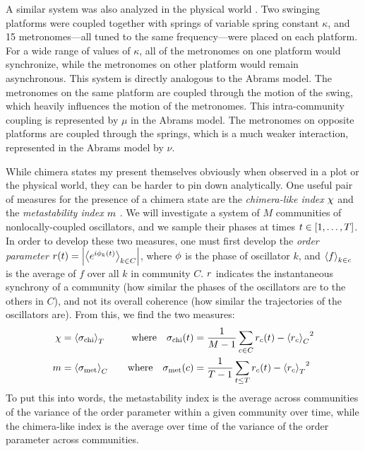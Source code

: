 A similar system was also analyzed in the physical world \cite{Martens2013}.
Two swinging platforms were coupled together with springs of variable spring constant $\kappa$, and 15 metronomes---all tuned to the same frequency---were placed on each platform.
For a wide range of values of $\kappa$, all of the metronomes on one platform would synchronize, while the metronomes on other platform would remain asynchronous.
This system is directly analogous to the Abrams model.
The metronomes on the same platform are coupled through the motion of the swing, which heavily influences the motion of the metronomes.
This intra-community coupling is represented by $\mu$ in the Abrams model.
The metronomes on opposite platforms are coupled through the springs, which is a much weaker interaction, represented in the Abrams model by $\nu$.

While chimera states my present themselves obviously when observed in a plot or the physical world, they can be harder to pin down analytically.
One useful pair of measures for the presence of a chimera state are the \textit{chimera-like index} $\chi$ and the \textit{metastability index} $m$ \cite{Shanahan2010,Hizanidis2016}.
We will investigate a system of $M$ communities of nonlocally-coupled oscillators, and we sample their phases at times $t \in \bqty{1, \ldots, T}$.
In order to develop these two measures, one must first develop the \textit{order parameter} $r(t) = \abs{\expval{e^{i \phi_{k}(t)}}_{k \in C}}$, where $\phi$ is the phase of oscillator $k$, and $\ev{f}_{k \in c}$ is the average of $f$ over all $k$ in community $C$.
$r$ indicates the instantaneous synchrony of a community (how similar the phases of the oscillators are to the others in $C$), and not its overall coherence (how similar the trajectories of the oscillators are).
From this, we find the two measures:
\begin{align}
  \label{eq:chimera}
  \chimera
  &=
    \expval{\sigma_{\text{chi}}}_{T}
  &
    \qq{where}
    \sigma_{\text{chi}}(t)
  &=
    \frac{1}{M - 1} \sum_{c \in C}{\ordparam_{c}(t) - \expval{\ordparam_{c}}_{C}}^{2} \\
  \label{eq:metastability}
  \meta
  &=
    \expval{\sigma_{\text{met}}}_{C}
  &
    \qq{where}
    \sigma_{\text{met}}(c)
  &=
    \frac{1}{T - 1} \sum_{t \leq T}{\ordparam_{c}(t) - \expval{\ordparam_{c}}_{T}}^{2}
\end{align}
To put this into words, the metastability index is the average across communities of the variance of the order parameter within a given community over time, while the chimera-like index is the average over time of the variance of the order parameter across communities.

